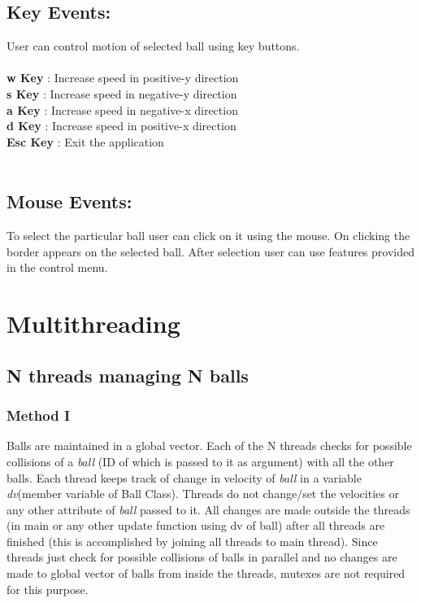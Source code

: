 \documentclass[a4paper,12pt]{report}
\begin{document}
\section{Key Events:}
User can control motion of selected ball using key buttons.\\\\
\textbf{w Key} : Increase speed in positive-y direction\\
\textbf{s Key} : Increase speed in negative-y direction\\
\textbf{a Key} : Increase speed in negative-x direction\\
\textbf{d Key} : Increase speed in positive-x direction\\
\textbf{Esc Key} : Exit the application\\\\
\section{Mouse Events:}
To select the particular ball user can click on it using the mouse. On clicking the border appears on the selected ball. After selection user can use features provided in the control menu.

\chapter{Multithreading}
\section{N threads managing N balls}
\subsection*{Method I}
Balls are maintained in a global vector. Each of the N threads checks for possible collisions of a \textit{ball} (ID of which is passed to it as argument) with all the other balls. Each thread keeps track of change in velocity of \textit{ball} in a variable \textit{dv}(member variable of Ball Class). Threads do not change/set the velocities or any other attribute of \textit{ball} passed to it. All changes are made outside the threads (in main or any other update function using dv of ball) after all threads are finished (this is accomplished by joining all threads to main thread). Since threads just check for possible collisions of balls in parallel and no changes are made to global vector of balls from inside the threads, mutexes are not required for this purpose.
\end{document}
